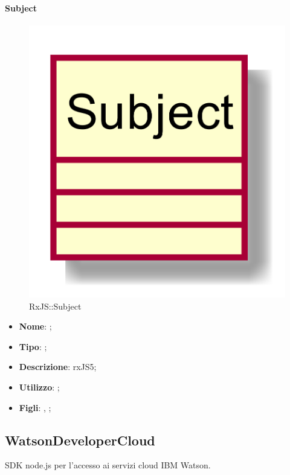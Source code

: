 \hypertarget{Subject_label}{\paragraph{Subject}}
\begin{figure}[h]
	\centering
	\includegraphics[width=\textwidth,height=\textheight,keepaspectratio]{images/ClassSubject.png}
	\caption{RxJS::Subject}
\end{figure}
\begin{itemize}
	\item \textbf{Nome}: ;
	\item \textbf{Tipo}: ;
	\item \textbf{Descrizione}: rxJS5;
	\item \textbf{Utilizzo}: ;
	\item \textbf{Figli}: , ;
\end{itemize}

\subsection{WatsonDeveloperCloud}
SDK node.js per l'accesso ai servizi cloud IBM Watson.
